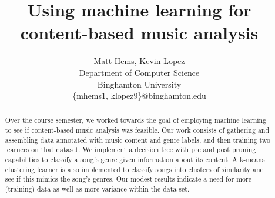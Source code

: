 \documentclass[11pt, twocolumn]{article}
\begin{document}
\title{Using machine learning for content-based music analysis}
\author{Matt Hems, Kevin Lopez\\
  Department of Computer Science\\
  Binghamton University\\
\{mhems1, klopez9\}@binghamton.edu}
\maketitle

\begin{abstract}
Over the course semester, we worked towards the goal of employing machine learning to see if content-based music analysis was feasible. Our work consists of gathering and assembling data annotated with music content and genre labels, and then training two learners on that dataset. We implement a decision tree with pre and post pruning capabilities to classify a song’s genre given information about its content. A k-means clustering learner is also implemented to classify songs into clusters of similarity and see if this mimics the song’s genres. Our modest results indicate a need for more (training) data as well as more variance within the data set.
\end{abstract}
\end{document}
